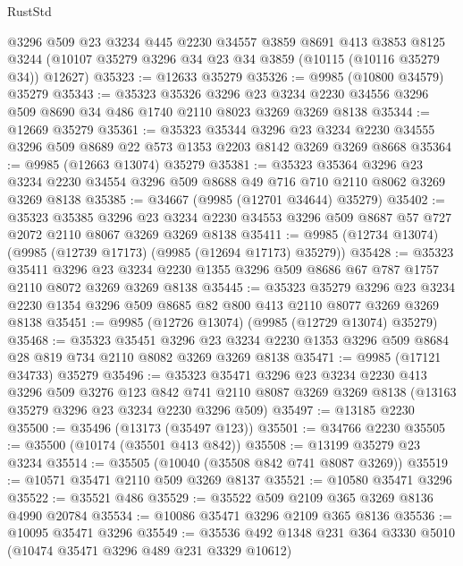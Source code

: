 \begin{lexlean}{RustStd}
\begin{coremodule}
    @3296
    @509
    @23
    @3234
    @445
    @2230
    @34557
    @3859
    @8691
    @413
    @3853
    @8125
    @3244
    (@10107 @35279 @3296 @34 @23 @34 @3859 (@10115 (@10116 @35279 @34)) @12627)
@35323 := @12633 @35279
@35326 := @9985 (@10800 @34579) @35279
@35343 := @35323
    @35326
    @3296
    @23
    @3234
    @2230
    @34556
    @3296
    @509
    @8690
    @34
    @486
    @1740
    @2110
    @8023
    @3269
    @3269
    @8138
@35344 := @12669 @35279
@35361 := @35323
    @35344
    @3296
    @23
    @3234
    @2230
    @34555
    @3296
    @509
    @8689
    @22
    @573
    @1353
    @2203
    @8142
    @3269
    @3269
    @8668
@35364 := @9985 (@12663 @13074) @35279
@35381 := @35323
    @35364
    @3296
    @23
    @3234
    @2230
    @34554
    @3296
    @509
    @8688
    @49
    @716
    @710
    @2110
    @8062
    @3269
    @3269
    @8138
@35385 := @34667 (@9985 (@12701 @34644) @35279)
@35402 := @35323
    @35385
    @3296
    @23
    @3234
    @2230
    @34553
    @3296
    @509
    @8687
    @57
    @727
    @2072
    @2110
    @8067
    @3269
    @3269
    @8138
@35411 := @9985 (@12734 @13074) (@9985 (@12739 @17173) (@9985 (@12694 @17173) @35279))
@35428 := @35323
    @35411
    @3296
    @23
    @3234
    @2230
    @1355
    @3296
    @509
    @8686
    @67
    @787
    @1757
    @2110
    @8072
    @3269
    @3269
    @8138
@35445 := @35323
    @35279
    @3296
    @23
    @3234
    @2230
    @1354
    @3296
    @509
    @8685
    @82
    @800
    @413
    @2110
    @8077
    @3269
    @3269
    @8138
@35451 := @9985 (@12726 @13074) (@9985 (@12729 @13074) @35279)
@35468 := @35323
    @35451
    @3296
    @23
    @3234
    @2230
    @1353
    @3296
    @509
    @8684
    @28
    @819
    @734
    @2110
    @8082
    @3269
    @3269
    @8138
@35471 := @9985 (@17121 @34733) @35279
@35496 := @35323
    @35471
    @3296
    @23
    @3234
    @2230
    @413
    @3296
    @509
    @3276
    @123
    @842
    @741
    @2110
    @8087
    @3269
    @3269
    @8138
    (@13163 @35279 @3296 @23 @3234 @2230 @3296 @509)
@35497 := @13185 @2230
@35500 := @35496 (@13173 (@35497 @123))
@35501 := @34766 @2230
@35505 := @35500 (@10174 (@35501 @413 @842))
@35508 := @13199 @35279 @23 @3234
@35514 := @35505 (@10040 (@35508 @842 @741 @8087 @3269))
@35519 := @10571 @35471 @2110 @509 @3269 @8137
@35521 := @10580 @35471 @3296
@35522 := @35521 @486
@35529 := @35522 @509 @2109 @365 @3269 @8136 @4990 @20784
@35534 := @10086 @35471 @3296 @2109 @365 @8136
@35536 := @10095 @35471 @3296
@35549 := @35536 @492 @1348 @231 @364 @3330 @5010 (@10474 @35471 @3296 @489 @231 @3329 @10612)

\end{coremodule}
\end{lexlean}
